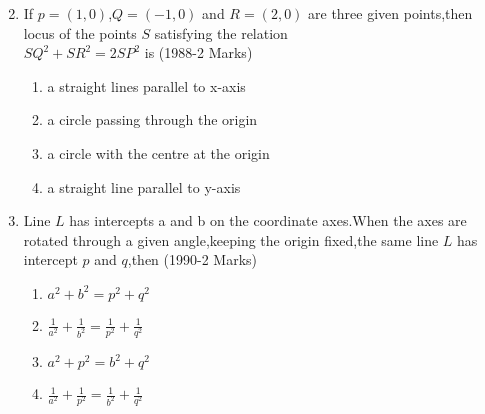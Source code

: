 \documentclass[journal,12pt,twocolumn]{IEEEtran}
\theoremstyle{remark}
\begin{document}
\begin{enumerate}
\begin{multicols}{2}
\begin{enumerate}
    \end{enumerate}
    \end{multicols}
    \item If $p=(1,0)$,$Q=(-1,0)$ and $R=(2,0)$ are three given points,then locus of the points $S$ satisfying the relation\\
    $SQ^2+SR^2=2SP^2$ is 
    \hfill(1988-2 Marks)
    \begin{enumerate}		    
        \item a straight lines parallel to x-axis
        \item a circle passing through the origin
        \item a circle with the centre at the origin 
        \item a straight line parallel to y-axis
    \end{enumerate}	
    \item Line $L$ has intercepts a and b on the coordinate axes.When the axes are rotated through a given angle,keeping the origin fixed,the same line $L$ has intercept $p$ and $q$,then 
    \hfill(1990-2 Marks)
    \begin{multicols}{2}
    \begin{enumerate}
        \item $a^2+b^2=p^2+q^2$
        \item $\frac{1}{a^2}+\frac{1}{b^2}=\frac{1}{p^2}+\frac{1}{q^2}$
        \item $a^2+p^2=b^2+q^2$
        \item $\frac{1}{a^2}+\frac{1}{p^2}=\frac{1}{b^2}+\frac{1}{q^2}$
    \end{enumerate}
    \end{multicols}    
\end{enumerate}
\end{document}
